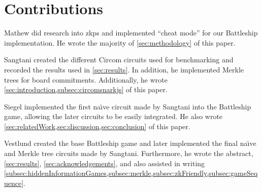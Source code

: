 \section{Contributions}

Mathew did research into \glspl{zkp} and implemented \enquote{cheat mode} for our Battleship implementation. He wrote the majority of \cref{sec:methodology} of this paper.

Sangtani created the different Circom circuits used for benchmarking and recorded the results used in \cref{sec:results}. In addition, he implemented Merkle trees for board commitments. Additionally, he wrote \cref{sec:introduction,subsec:circomsnarkjs} of this paper.

Siegel implemented the first na{\"\i}ve circuit made by Sangtani into the Battleship game, allowing the later circuits to be easily integrated. He also wrote \cref{sec:relatedWork,sec:discussion,sec:conclusion} of this paper.

Vestlund created the base Battleship game and later implemented the final na{\"\i}ve and Merkle tree circuits made by Sangtani. Furthermore, he wrote the abstract, \cref{sec:results}, \cref{sec:acknowledgements}, and also assisted in writing \cref{subsec:hiddenInformationGames,subsec:merkle,subsec:zkFriendly,subsec:gameSequence}.
